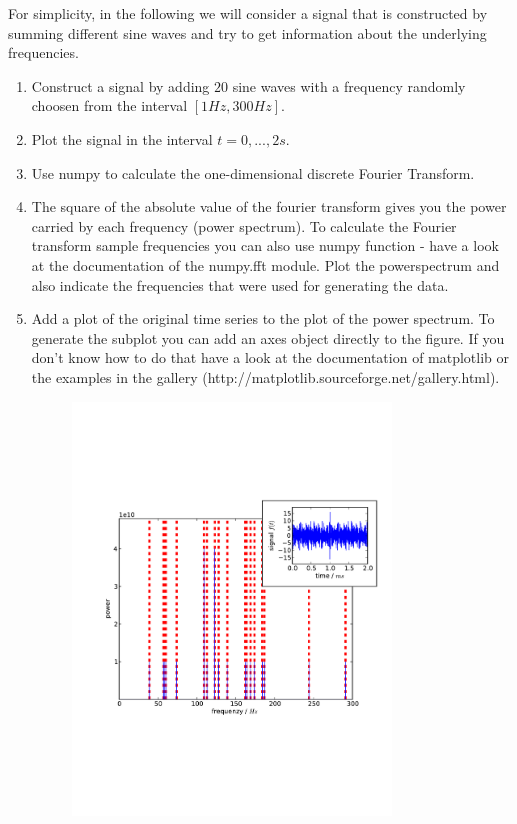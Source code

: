 \documentclass[smallheadings,12pt]{scrartcl}
\begin{document}
For simplicity, in the following we will consider a signal that is constructed by summing different sine waves and try to get information about the underlying frequencies.
\begin{enumerate}
 \item Construct a signal by adding $20$ sine waves with a frequency randomly choosen from the interval $[1Hz, 300Hz]$.
 \item Plot the signal in the interval $t=0,...,2s$.
 \item Use numpy to calculate the one-dimensional discrete Fourier Transform.
 \item The square of the absolute value of the fourier transform gives you the power carried by each frequency (power spectrum). To calculate the Fourier transform sample frequencies you can also use numpy function - have a look at the documentation of the numpy.fft module. Plot the powerspectrum and also indicate the frequencies that were used for generating the data.
 \item Add a plot of the original time series to the plot of the power spectrum. To generate the subplot you can add an axes object directly to the figure. If you don't know how to do that have a look at the documentation of matplotlib or the examples in the gallery (http://matplotlib.sourceforge.net/gallery.html).

\begin{figure}[H]
  \centering
  \includegraphics[width=0.8\textwidth]{pics/power}
\end{figure}
 
\end{enumerate}
\end{document}
